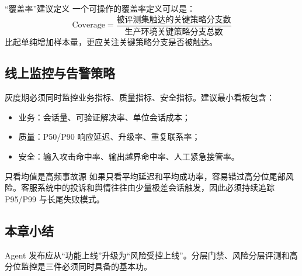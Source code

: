 \begin{knowledgebox}{“覆盖率”建议定义}
一个可操作的覆盖率定义可以是：
\[
\text{Coverage} = \frac{\text{被评测集触达的关键策略分支数}}{\text{生产环境关键策略分支总数}}
\]
比起单纯增加样本量，更应关注关键策略分支是否被触达。
\end{knowledgebox}

\subsection{线上监控与告警策略}

灰度期必须同时监控业务指标、质量指标、安全指标。建议最小看板包含：
\begin{itemize}[leftmargin=1.5em]
    \item 业务：会话量、可验证解决率、单位会话成本；
    \item 质量：P50/P90 响应延迟、升级率、重复联系率；
    \item 安全：输入攻击命中率、输出越界命中率、人工紧急接管率。
\end{itemize}

\begin{warningbox}{只看均值是高频事故源}
如果只看平均延迟和平均成功率，容易错过高分位尾部风险。客服系统中的投诉和舆情往往由少量极差会话触发，因此必须持续追踪 P95/P99 与长尾失败模式。
\end{warningbox}

\subsection{本章小结}

Agent 发布应从“功能上线”升级为“风险受控上线”。分层门禁、风险分层评测和高分位监控是三件必须同时具备的基本功。


